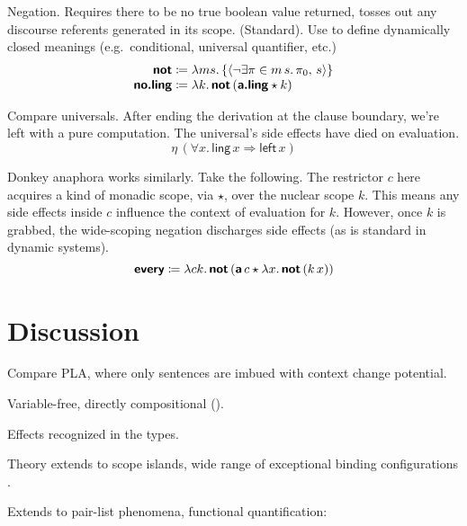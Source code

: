 	Negation. Requires there to be no true boolean value returned, tosses out any discourse referents generated in its scope. (Standard). Use to define dynamically closed meanings (e.g.~conditional, universal quantifier, etc.) %
	\[\begin{array}{r@{}l}
		\bsf{not}&{}\ceq \lambda ms.\left\{\ab{\neg\exists \pi \in m\,s.\,\pi_0,\,s}\right\}%
		\\
		\bsf{no.ling}&{}\ceq \lambda k.\,\bsf{not}\,(\bsf{a.ling} \star k)%
	\end{array}\]%
	
	Compare universals. After ending the derivation at the clause boundary, we're left with a pure computation. The universal's side effects have died on evaluation.%
	\[\eta\,(\forall x.\,\textsf{ling}\,x \Rightarrow \textsf{left}\,x)\]
	
	Donkey anaphora works similarly. Take the following. The restrictor $c$ here acquires a kind of monadic scope, via $\star$, over the nuclear scope $k$. This means any side effects inside $c$ influence the context of evaluation for $k$. However, once $k$ is grabbed, the wide-scoping negation discharges side effects (as is standard in dynamic systems). %
	\[\textbf{\textsf{every}} \coloneqq \lambda ck.\,\textbf{\textsf{not}}\,(\textbf{\textsf{a}}\,c \star \lambda x.\,\textbf{\textsf{not}}\,(k\,x))\]%

\section{Discussion}
	Compare PLA, where only sentences are imbued with context change potential. %
	
	Variable-free, directly compositional (\citealt{Jacobson:1999}).
	
	Effects recognized in the types. 
	
	Theory extends to scope islands, wide range of exceptional binding configurations \citealt{Charlow:diss}. %
	
	Extends to pair-list phenomena, functional quantification: \citealt{Bumford:inc}%

{\small}
